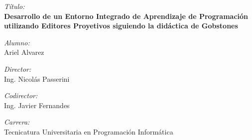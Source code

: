 \Large \emph{Título:}\\
\textbf{Desarrollo de un Entorno Integrado de Aprendizaje de Programación utilizando Editores Proyetivos siguiendo la didáctica de Gobstones}
\bigskip

\Large \emph{Alumno:}\\
Ariel Alvarez
\bigskip

\Large \emph{Director:}\\
Ing. Nicolás Passerini
\bigskip

\Large \emph{Codirector:}\\
Ing. Javier Fernandes
\bigskip


\Large \emph{Carrera:}\\
Tecnicatura Universitaria en Programación Informática
